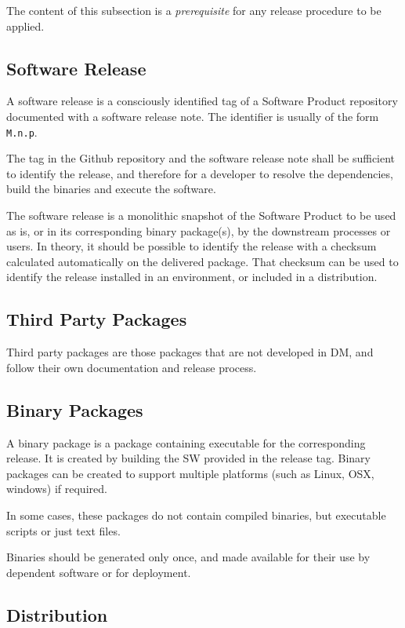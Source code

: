 The content of this subsection is a \textit{prerequisite} for any release procedure to be applied.


\subsection{Software Release} \label{sec:defrelease}

A software release is a consciously identified tag of a Software Product repository documented with a software release note.
The identifier is usually of the form \texttt{M.n.p}.

The tag in the Github repository and the software release note shall be sufficient to identify the release, and therefore for a developer
to resolve the dependencies, build the binaries and execute the software.

The software release is a monolithic snapshot of the Software Product to be used as is, or in its corresponding binary package(s), by the downstream processes or users.
In theory, it should be possible to identify the release with a checksum calculated automatically on the delivered package.
That checksum can be used to identify the release installed in an environment, or included in a distribution.


\subsection{Third Party Packages}

Third party packages are those packages that are not developed in DM, and follow their own documentation and release process.


\subsection{Binary Packages} \label{sec:swbpkg}

A binary package is a package containing executable for the corresponding release.
It is created by building the SW provided in the release tag.
Binary packages can be created to support multiple platforms (such as Linux, OSX, windows) if required.

In some cases, these packages do not contain compiled binaries, but executable scripts or just text files.

Binaries should be generated only once, and made available for their use by dependent software or for deployment.


\subsection{Distribution} \label{sec:distribution}


